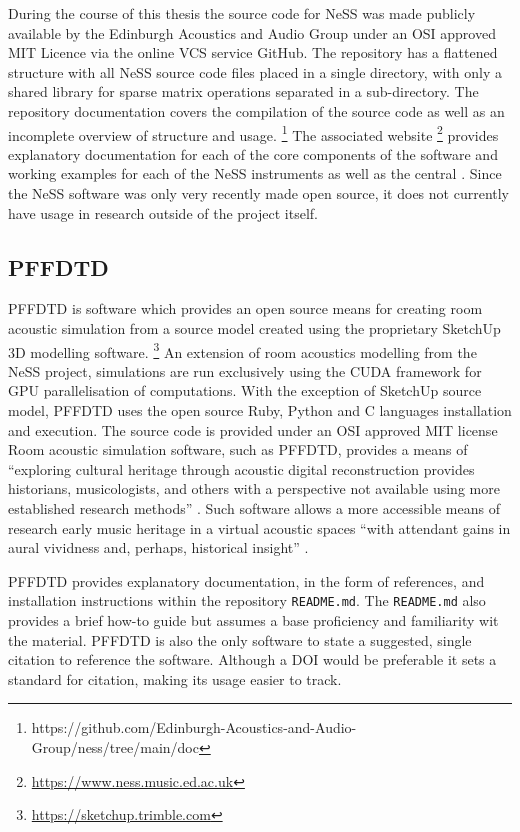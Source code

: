 During the course of this thesis the source code for NeSS was made publicly available by the Edinburgh Acoustics and Audio Group under an OSI approved MIT Licence via the online VCS service GitHub. The repository has a flattened structure with all NeSS source code files placed in a single directory, with only a shared library for sparse matrix operations separated in a sub-directory. 
The repository documentation covers the compilation of the source code as well as an incomplete overview of structure and usage.
\footnote{https://github.com/Edinburgh-Acoustics-and-Audio-Group/ness/tree/main/doc}
The associated website 
\footnote{\url{https://www.ness.music.ed.ac.uk}}
provides explanatory documentation for each of the core components of the software and working examples for each of the NeSS instruments as well as the central  \cite{ness_welcome_2016}. 
Since the NeSS software was only very recently made open source, it does not currently have usage in research outside of the project itself. 


\subsection{PFFDTD}

PFFDTD \cite{hamilton_pffdtd_2021} is software which provides an open source means for creating room acoustic simulation from a source model created using the proprietary SketchUp 3D modelling software.
\footnote{\url{https://sketchup.trimble.com}}
An extension of room acoustics modelling from the NeSS project, simulations are run exclusively using the CUDA framework for GPU parallelisation of computations. With the exception of SketchUp source model, PFFDTD uses the open source Ruby, Python and C languages installation and execution. 
The source code is provided under an OSI approved MIT license
Room acoustic simulation software, such as PFFDTD, provides a means of ``exploring cultural heritage through acoustic digital reconstruction provides historians, musicologists, and others with a perspective not available using more established research methods'' \cite{katz_exploring_2020}. Such software allows  a more accessible means of research early music heritage in a virtual acoustic spaces \cite{tronchin_acoustics_1997} ``with attendant gains in
aural vividness and, perhaps, historical insight'' \cite{cook_hearing_2023}.

PFFDTD provides explanatory documentation, in the form of references, and installation instructions within the repository \texttt{README.md}. The \texttt{README.md} also provides a brief how-to guide but assumes a base proficiency and familiarity wit the material. PFFDTD is also the only software to state a suggested, single citation to reference the software. Although a DOI would be preferable it sets a standard for citation, making its usage easier to track.

